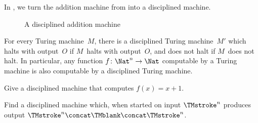 \documentclass[../../../include/open-logic-section]{subfiles}
\begin{document}
\begin{ex}
In , we turn the addition machine
from  into a disciplined machine.
\begin{figure}
\centering
{}
\caption{A disciplined addition machine}
\end{figure}
\end{ex}

\begin{prop} For every Turing machine~$M$,
there is a disciplined Turing machine~$M'$ which halts with output~$O$
if $M$~halts with output~$O$, and does not halt if $M$~does not halt.
In particular, any function $f\colon\Nat^n \to \Nat$ computable by a
Turing machine is also computable by a disciplined Turing machine.
\end{prop}

\begin{prob}\label{tur:mac:dis:prob:disc-succ}
Give a disciplined machine that computes $f(x) = x+1$.
\end{prob}


\begin{prob}\label{tur:mac:dis:prob:copier}
Find a disciplined machine which, when started on input $\TMstroke^n$
produces output $\TMstroke^n \concat \TMblank \concat \TMstroke^n$.
\end{prob}
\end{document}

